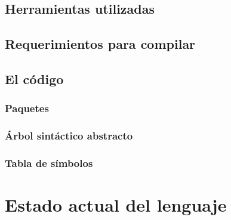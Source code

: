 \documentclass[12pt, spanish]{report}
\begin{document}
\section{Herramientas utilizadas}
\label{sec:herramientas}


\section{Requerimientos para compilar}
\label{sec:requ}


\section{El código}
\label{sec:codigo}

\subsection{Paquetes}
\label{sec:paquetes}

\subsection{Árbol sintáctico abstracto}
\label{sec:ast}

\subsection{Tabla de símbolos}
\label{sec:st}



\chapter{Estado actual del lenguaje}
\label{chap:estado}
\end{document}
